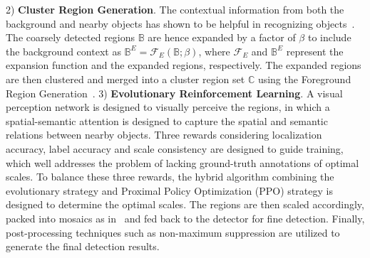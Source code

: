 \documentclass[letterpaper]{article} %
\newcommand\blue[1]{\textcolor{blue}{#1}}
\newcommand\rjf[1]{\textcolor{red}{\{RJF: #1\}}}
\newcommand\yxy[1]{\textcolor{blue}{\{YXY: #1\}}}
\newcommand\qz[1]{\textcolor{blue}{\{QZ: #1\}}}
\begin{document}
2) %
\textbf{Cluster Region Generation}. %
The contextual information from both the background and nearby objects has shown to be helpful in recognizing objects~\cite{%
Zhang_2022_Spatial, Zhang_2023_Spatial}. The coarsely detected regions $\mathbb{B}$ are hence expanded by a factor of $\beta$ to include the background context as $\mathbb{B}^{E} = \mathcal{F}_{E}\left(\mathbb{B}; \beta \right)$,   
where $\mathcal{F}_{E}$ and $\mathbb{B}^{E}$ represent the expansion function and the expanded regions, respectively. 
The expanded regions are then clustered and merged into a cluster region set $\mathbb{C}$ using the Foreground Region Generation~\cite{Huang_2022_UFPMP}. 
3) %
\textbf{Evolutionary Reinforcement Learning}. %
A visual perception network is designed to visually perceive the regions, in which a spatial-semantic attention is designed to capture the spatial and semantic relations between nearby objects. Three rewards considering localization accuracy, label accuracy and scale consistency are designed to guide training, which well addresses the problem of lacking ground-truth annotations of optimal scales. To balance these three rewards, the hybrid algorithm combining the evolutionary strategy and Proximal Policy Optimization (PPO) strategy is designed to determine the optimal scales. %
The regions are then scaled accordingly, packed into mosaics as in~\cite{Huang_2022_UFPMP} and fed back to the detector for fine detection. Finally, post-processing techniques such as non-maximum suppression are utilized to generate the final detection results. 
\end{document}
